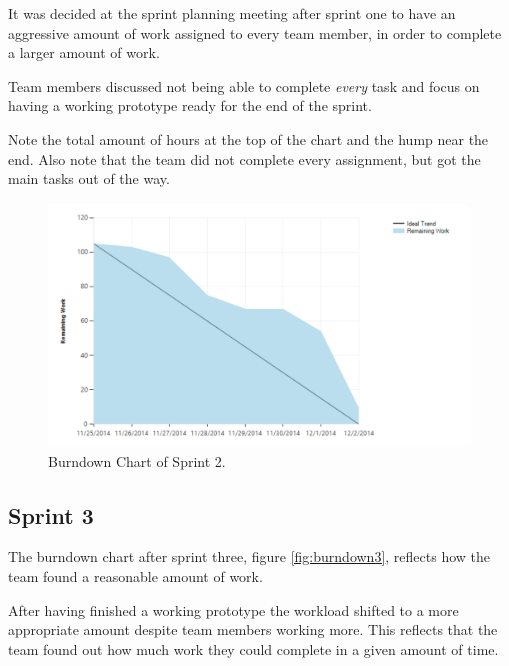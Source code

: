 It was decided at the sprint planning meeting after sprint one to have an aggressive amount of work assigned to every team member, in order to complete a larger amount of work. 

Team members discussed not being able to complete \textit{every} task and focus on having a working prototype ready for the end of the sprint.

Note the total amount of hours at the top of the chart and the hump near the end. Also note that the team did not complete every assignment, but got the main tasks out of the way.

\begin{figure}[H]
	\centering
	\includegraphics[width=\textwidth]{Figures/Burndown2}
	\caption{Burndown Chart of Sprint 2.}
	\label{fig:burndown2}
\end{figure}

\subsection{Sprint 3}
The burndown chart after sprint three, figure \ref{fig:burndown3}, reflects how the team found a reasonable amount of work. 

After having finished a working prototype the workload shifted to a more appropriate amount despite team members working more. This reflects that the team found out how much work they could complete in a given amount of time.

